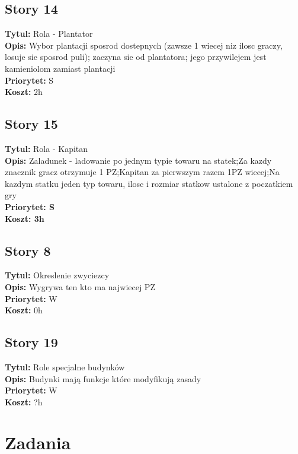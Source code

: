 \documentclass[12pt]{article}
\begin{document}
\subsection{Story 14}
\textbf{Tytul:} Rola - Plantator \\
\textbf{Opis:} Wybor plantacji sposrod dostepnych (zawsze 1 wiecej niz ilosc
graczy, losuje sie sposrod puli); zaczyna sie od plantatora; jego
przywilejem jest kamieniolom zamiast plantacji \\
\textbf{Priorytet:} S \\
\textbf{Koszt:} 2h \\

\subsection{Story 15 }
\textbf{Tytul:} Rola - Kapitan \\
\textbf{Opis:} Zaladunek - ladowanie po jednym typie towaru na statek;Za kazdy
znacznik gracz otrzymuje 1 PZ;Kapitan za pierwszym razem 1PZ wiecej;Na kazdym
statku jeden typ towaru, ilosc i rozmiar statkow ustalone z poczatkiem gry \\
\textbf{Priorytet: S}  \\
\textbf{Koszt: 3h}  \\

\subsection{Story 8}
\textbf{Tytul:} Okreslenie zwyciezcy \\
\textbf{Opis:} Wygrywa ten kto ma najwiecej PZ \\
\textbf{Priorytet:} W \\
\textbf{Koszt:} 0h \\

\subsection{Story 19}
\textbf{Tytul:} Role specjalne budynków \\
\textbf{Opis:} Budynki mają funkcje które modyfikują zasady \\
\textbf{Priorytet:} W \\
\textbf{Koszt:} ?h \\

\section{Zadania}
\end{document}
